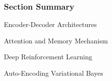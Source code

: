 \begin{frame}
\frametitle{Section Summary}
\bi
\item Encoder-Decoder Architectures
\item Attention and Memory Mechanism
\item Deep Reinforcement Learning
\item Auto-Encoding Variational Bayes
\ei 
\end{frame}



